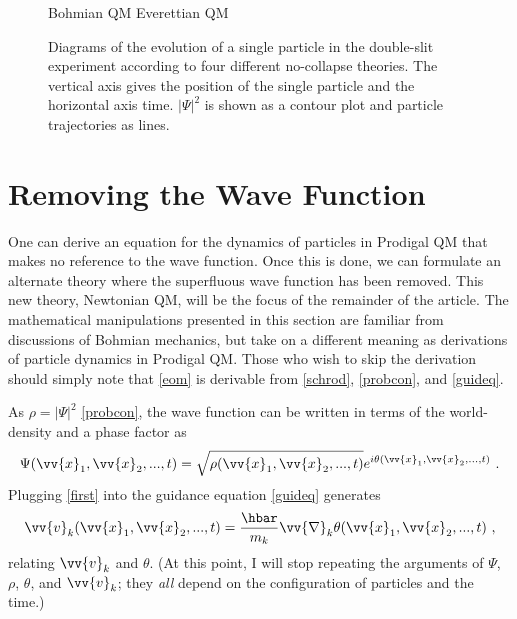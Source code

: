 \documentclass[onecolumn,secnumarabic,balancelastpage,amsmath,amssymb,nofootinbib]{article}
\begin{document}
\begin{figure}[h!]
\large{\hspace*{3 cm} Bohmian QM \hspace{3.9 cm} Everettian QM}
\caption{Diagrams of the evolution of a single particle in the double-slit experiment according to four different no-collapse theories.  The vertical axis gives the position of the single particle and the horizontal axis time.  $|\Psi|^2$ is shown as a contour plot and particle trajectories as lines.}
\label{NoCollapseQMs}
\end{figure}

\section{Removing the Wave Function}\label{removing}

One can derive an equation for the dynamics of particles in Prodigal QM that makes no reference to the wave function.  Once this is done, we can formulate an alternate theory where the superfluous wave function has been removed.  This new theory, Newtonian QM, will be the focus of the remainder of the article.  The mathematical manipulations presented in this section are familiar from discussions of Bohmian mechanics, but take on a different meaning as derivations of particle dynamics in Prodigal QM.  Those who wish to skip the derivation should simply note that \eqref{eom} is derivable from \eqref{schrod}, \eqref{probcon}, and \eqref{guideq}.

As $\rho=|\Psi|^2$ \eqref{probcon}, the wave function can be written in terms of the world-density and a phase factor as
\begin{equation}
\Psi(\vv{x}_1,\vv{x}_2,...,t)=\sqrt{\rho(\vv{x}_1,\vv{x}_2,...,t)}e^{i\theta(\vv{x}_1,\vv{x}_2,...,t)}\ .
\label{first}
\end{equation}
Plugging \eqref{first} into the guidance equation \eqref{guideq} generates
\begin{equation}
\vv{v}_k(\vv{x}_1,\vv{x}_2,...,t)=\frac{\hbar}{m_k}\vv{\nabla}_k\theta(\vv{x}_1,\vv{x}_2,...,t)\ ,
\label{guideq2}
\end{equation}
relating $\vv{v}_k$ and $\theta$.  (At this point, I will stop repeating the arguments of $\Psi$, $\rho$, $\theta$, and $\vv{v}_k$; they \emph{all} depend on the configuration of particles and the time.)
\end{document}
